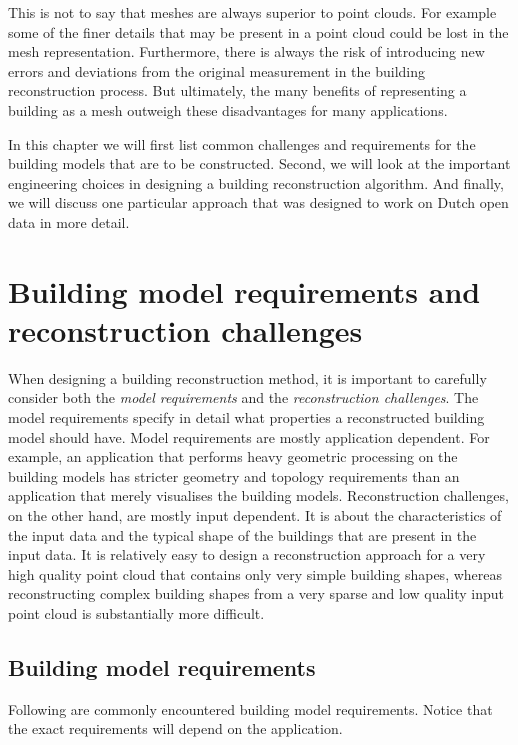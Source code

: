 This is not to say that meshes are always superior to point clouds. 
For example some of the finer details that may be present in a point cloud could be lost in the mesh representation. 
Furthermore, there is always the risk of introducing new errors and deviations from the original measurement in the building reconstruction process. 
But ultimately, the many benefits of representing a building as a mesh outweigh these disadvantages for many applications.

In this chapter we will first list common challenges and requirements for the building models that are to be constructed. Second, we will look at the important engineering choices in designing a building reconstruction algorithm. And finally, we will discuss one particular approach that was designed to work on Dutch open data in more detail.

%
\section{Building model requirements and reconstruction challenges}
When designing a building reconstruction method, it is important to carefully consider both the \emph{model requirements} and the \emph{reconstruction challenges}. 
The model requirements specify in detail what properties a reconstructed building model should have. 
Model requirements are mostly application dependent.
For example, an application that performs heavy geometric processing on the building models has stricter geometry and topology requirements than an application that merely visualises the building models.
Reconstruction challenges, on the other hand, are mostly input dependent. 
It is about the characteristics of the input data and the typical shape of the buildings that are present in the input data.
It is relatively easy to design a reconstruction approach for a very high quality point cloud that contains only very simple building shapes, whereas reconstructing complex building shapes from a very sparse and low quality input point cloud is substantially more difficult.

\subsection{Building model requirements}
Following are commonly encountered building model requirements. Notice that the exact requirements will depend on the application.

